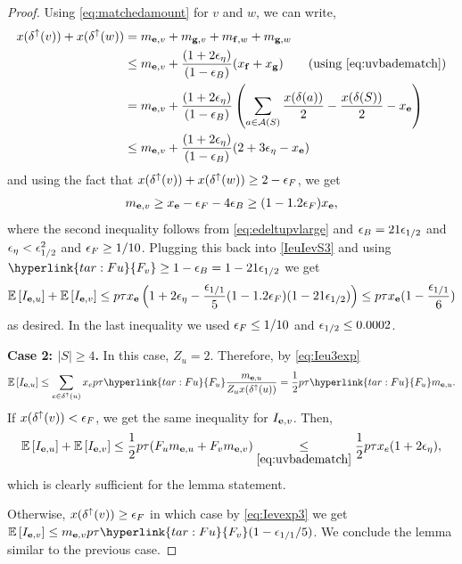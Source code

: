 \begin{proof}
Using \eqref{eq:matchedamount} for $v$ and $w$, we can write,
\begin{align*}
x(\delta^\uparrow(v))+x(\delta^\uparrow(w)) &= m_{\bbe,v} + m_{\bbg,v} + m_{\bbf,w}+m_{\bbg,w}\\ &\leq m_{\bbe,v} +    \frac{(1+2\eps_\eta)}{(1-\eps_B)} (x_\bbf + x_{\bbg}) \tag{using \eqref{eq:uvbadematch}}\\
&= m_{\bbe,v} + \frac{(1+2\eps_\eta)}{(1-\eps_B)} \left(\sum_{a\in\cA(S)} \frac{x(\delta(a))}{2} - \frac{x(\delta(S))}{2} - x_\bbe\right)\\
&\leq m_{\bbe,v} +  \frac{(1+2\eps_\eta)}{(1-\eps_B)}  (2+3\eps_\eta-x_\bbe) %
\end{align*}
and using the fact that $x(\delta^\uparrow(v))+x(\delta^\uparrow(w))\geq 2-{\epsilon}_F$, we get $$ m_{{\bf e},v}\geq x_{\bf e} -{\epsilon}_F-4{\epsilon}_B  \geq (1- 1.2{\epsilon}_F)x_{\bf e},$$ 
 where the second inequality follows from  \eqref{eq:edeltupvlarge}
 and ${\epsilon}_B = 21 {\epsilon}_{1/2}$ and ${\epsilon}_\eta <{\epsilon}_{1/2}^2$ and ${\epsilon}_F\geq 1/10$.
Plugging this back into \eqref{IeuIevS3} and using $\hyperlink{tar:Fu}{F_v}\geq 1-\eps_B= 1-21\eps_{1/2}$ we get
$$ {\mathbb{E}}\left[I_{{\bf e},u}\right]+{\mathbb{E}}\left[I_{{\bf e},v}\right]\leq p\tau x_{\bf e} \left(1+2{\epsilon}_\eta - \frac{{\epsilon}_{1/1}}{5} (1-1.2{\epsilon}_F)(1-21{\epsilon}_{1/2})\right) \leq p\tau x_{\bf e} (1-\frac{{\epsilon}_{1/1}}{6}) $$
as desired. In the last inequality we used ${\epsilon}_F\leq 1/10$ and ${\epsilon}_{1/2}\leq  0.0002$.

{\bf Case 2: $|S|	\geq 4$.} 
In this case,  $Z_u = 2$. 
Therefore, by \cref{eq:Ieu3exp}
$$ \E{I_{\bbe,u}} \leq \sum_{e\in\delta^\uparrow(u)} x_e p\tau \hyperlink{tar:Fu}{F_u} \frac{m_{\bbe,u}}{Z_u x(\delta^\uparrow(u))} = \frac12 p\tau \hyperlink{tar:Fu}{F_u} m_{\bbe,u}.$$
If $x(\delta^\uparrow(v))<{\epsilon}_F$, we get the same inequality for $I_{{\bf e},v}$. Then, 
$${\mathbb{E}}\left[I_{{\bf e},u}\right] + {\mathbb{E}}\left[I_{{\bf e},v}\right] \le \frac12 p\tau (F_um_{{\bf e},u} + F_vm_{{\bf e},v}) \underset{\eqref{eq:uvbadematch}}{\le} \frac12 p\tau x_e(1+2{\epsilon}_\eta),$$
which is clearly sufficient for the lemma statement.

Otherwise, $x(\delta^\uparrow(v))\geq {\epsilon}_F$ in which case by \eqref{eq:Ievexp3} we get $\E{I_{\bbe,v}}\leq m_{\bbe,v} p\tau \hyperlink{tar:Fu}{F_v}(1-\eps_{1/1}/5)$. We conclude the lemma similar to the previous case.
%
\end{proof}

